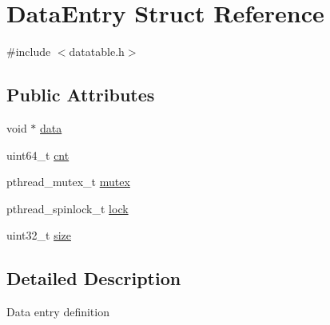 \hypertarget{structDataEntry}{\section{\-Data\-Entry \-Struct \-Reference}
\label{structDataEntry}
}


{\ttfamily \#include $<$datatable.\-h$>$}

\subsection*{\-Public \-Attributes}
\begin{DoxyCompactItemize}
\item 
void $\ast$ \hyperlink{structDataEntry_a0260676fd4fea77dee47c1c13cf58368}{data}
\item 
uint64\-\_\-t \hyperlink{structDataEntry_ac370f0b6417e245082350869d6b539c5}{cnt}
\item 
pthread\-\_\-mutex\-\_\-t \hyperlink{structDataEntry_ae7bbcaa15d9472be5ea1dad131d0831c}{mutex}
\item 
pthread\-\_\-spinlock\-\_\-t \hyperlink{structDataEntry_a5206ede459648d4ad842f373f7585427}{lock}
\item 
uint32\-\_\-t \hyperlink{structDataEntry_a4020c081bf0b0928ee81b15896b31b8b}{size}
\end{DoxyCompactItemize}


\subsection{\-Detailed \-Description}
\-Data entry definition 


